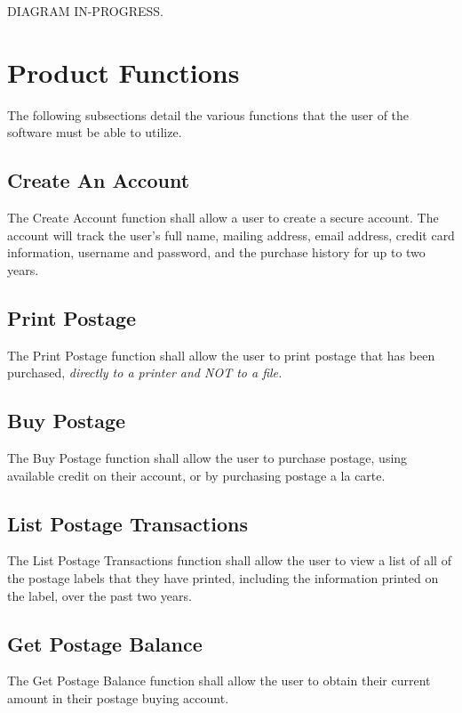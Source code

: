 \documentclass{scrreprt}
\begin{document}
DIAGRAM IN-PROGRESS.

\section{Product Functions}

The following subsections detail the various functions that the user of the 
software must be able to utilize.

\subsection{Create An Account}

The Create Account function shall allow a user to create a secure account. The
account will track the user’s full name, mailing address, email address, credit
card information, username and password, and the purchase history for up to two
years.

\subsection{Print Postage}

The Print Postage function shall allow the user to print postage that has been 
purchased, \emph{directly to a printer and NOT to a file.}

\subsection{Buy Postage}

The Buy Postage function shall allow the user to purchase postage, using
available credit on their account, or by purchasing postage a la carte.

\subsection{List Postage Transactions}

The List Postage Transactions function shall allow the user to view a list of
all of the postage labels that they have printed, including the information
printed on the label, over the past two years.

\subsection{Get Postage Balance}

The Get Postage Balance function shall allow the user to obtain their current
amount in their postage buying account.
\end{document}
